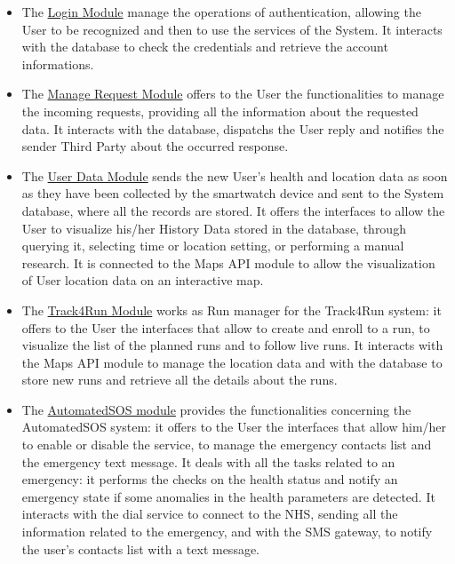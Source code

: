 \begin{itemize}
    \item The \underline{Login Module} manage the operations of authentication, allowing the User to be recognized and then to use the services of the System. It interacts with the database to check the credentials and retrieve the account informations.
    
    \item The \underline{Manage Request Module} offers to the User the functionalities to manage the incoming requests, providing all the information about the requested data. It interacts with the database, dispatchs the User reply and notifies the sender Third Party about the occurred response.
    
    \item The \underline{User Data Module} sends the new User's health and location data as soon as they have been collected by the smartwatch device and sent to the System database, where all the records are stored.
    It offers the interfaces to allow the User to visualize his/her History Data stored in the database, through querying it, selecting time or location setting, or performing a manual research. It is connected to the Maps API module to allow the visualization of User location data on an interactive map.
    
    \item The \underline{Track4Run Module} works as Run manager for the Track4Run system: it offers to the User the interfaces that allow to create and enroll to a run, to visualize the list of the planned runs and to follow live runs. It interacts with the Maps API module to manage the location data and with the database to store new runs and retrieve all the details about the runs.
    
    \item The \underline{AutomatedSOS module} provides the functionalities concerning the AutomatedSOS system: it offers to the User the interfaces that allow him/her to enable or disable the service, to manage the emergency contacts list and the emergency text message.
    It deals with all the tasks related to an emergency: it performs the checks on the health status and notify an emergency state if some anomalies in the health parameters are detected. It interacts with the dial service to connect to the NHS, sending all the information related to the emergency, and with the SMS gateway, to notify the user's contacts list with a text message.

\end{itemize}